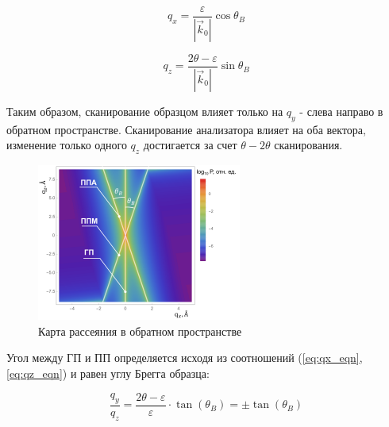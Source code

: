 \begin{equation}
  q_x = \frac{\varepsilon}{|\vec{k}_0|} \cos \theta_B
  \label{eq:qx_eqn}
\end{equation}

\begin{equation}
  q_z = \frac{2\theta - \varepsilon}{|\vec{k}_0|} \sin \theta_B
  \label{eq:qz_eqn}
\end{equation}

Таким образом, сканирование образцом влияет только на $q_y$ - слева направо в обратном пространстве.
Сканирование анализатора влияет на оба вектора, изменение только одного $q_z$ достигается за
счет $\theta-2\theta$ сканирования.

\begin{figure}[H]
  \centering
  \includegraphics[width=0.6\textwidth]{images/triple_map_reciprocal_space.png}
  \caption{Карта рассеяния в обратном пространстве}
  \label{ris:triple_map_reciprocal_space}
\end{figure}

Угол между ГП и ПП определяется исходя из соотношений (\ref{eq:qx_eqn}, \ref{eq:qz_eqn}) и равен углу Брегга образца:

\begin{equation}
  \frac{q_y}{q_z} = \frac{2\theta - \varepsilon}{\varepsilon} \cdot \tan (\theta_B) = \pm \tan (\theta_B)
  \label{eq:qz_eqn}
\end{equation}
